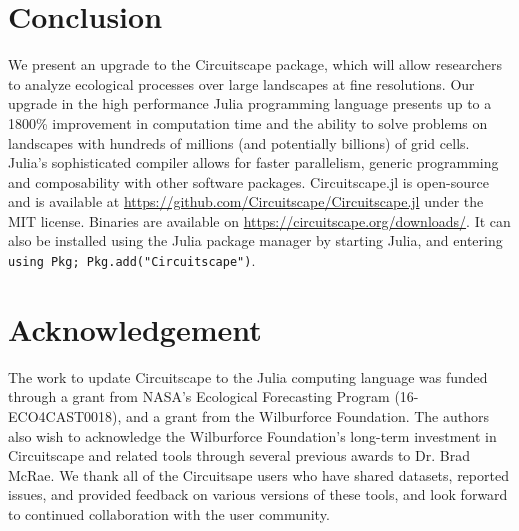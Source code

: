 \documentclass{juliacon}
\begin{document}

\section{Conclusion}
We present an upgrade to the Circuitscape package, which will allow researchers to analyze ecological processes over large landscapes at fine resolutions. Our upgrade in the high performance Julia programming language presents up to a 1800\% improvement in computation time and the ability to solve problems on landscapes with hundreds of millions (and potentially billions) of grid cells. Julia’s sophisticated compiler allows for faster parallelism, generic programming and composability with other software packages. Circuitscape.jl is open-source and is available at \url{https://github.com/Circuitscape/Circuitscape.jl} under the MIT license. Binaries are available on \url{https://circuitscape.org/downloads/}. It can also be installed using the Julia package manager by starting Julia, and entering \texttt{using Pkg; Pkg.add("Circuitscape")}. 

\section{Acknowledgement}
The work to update Circuitscape to the Julia computing language was funded through a grant from NASA’s Ecological Forecasting Program (16-ECO4CAST0018), and a grant from the Wilburforce Foundation.  The authors also wish to acknowledge the Wilburforce Foundation’s long-term investment in Circuitscape and related tools through several previous awards to Dr. Brad McRae.  We thank all of the Circuitsape users who have shared datasets, reported issues, and provided feedback on various versions of these tools, and look forward to continued collaboration with the user community. 


\end{document}
